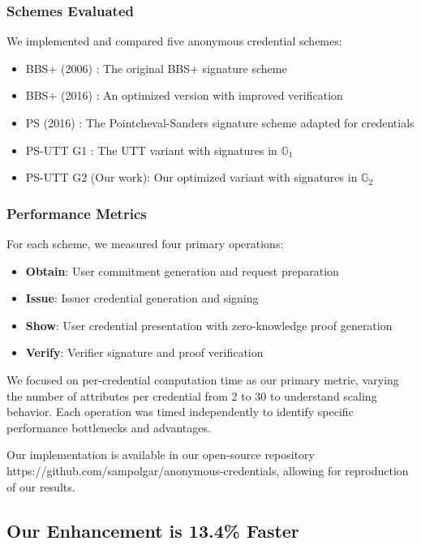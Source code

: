 \subsubsection{Schemes Evaluated}
We implemented and compared five anonymous credential schemes:
\begin{itemize}
    \item BBS+ (2006) \cite{hutchison_constant-size_2006}: The original BBS+ signature scheme
    \item BBS+ (2016) \cite{camenisch_anonymous_2016}: An optimized version with improved verification
    \item PS (2016) \cite{sako_short_2016}: The Pointcheval-Sanders signature scheme adapted for credentials
    \item PS-UTT G1 \cite{tomescu_utt_2022}: The UTT variant with signatures in $\mathbb{G}_1$
    \item PS-UTT G2 (Our work): Our optimized variant with signatures in $\mathbb{G}_2$
\end{itemize}

\subsubsection{Performance Metrics}
For each scheme, we measured four primary operations:
\begin{itemize}
    \item \textbf{Obtain}: User commitment generation and request preparation
    \item \textbf{Issue}: Issuer credential generation and signing
    \item \textbf{Show}: User credential presentation with zero-knowledge proof generation
    \item \textbf{Verify}: Verifier signature and proof verification
\end{itemize}

We focused on per-credential computation time as our primary metric, varying the number of attributes per credential from 2 to 30 to understand scaling behavior. Each operation was timed independently to identify specific performance bottlenecks and advantages.

Our implementation is available in our open-source repository https://github.com/sampolgar/anonymous-credentials, allowing for reproduction of our results.




\subsection{Our Enhancement is 13.4\% Faster}

